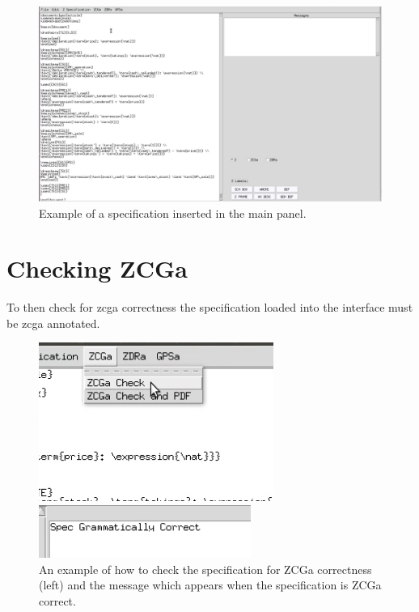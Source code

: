 \begin{figure}[H]
\includegraphics[scale=0.4]{Figures/Interface/specinserted.png}
\caption{Example of a specification inserted in the main panel. \label{fig:specinserted}}
\end{figure}

\section{Checking ZCGa}
To then check for \gls{zcga} correctness the specification loaded into the interface must be \gls{zcga} annotated.

\begin{figure}[H]
\centering
\begin{minipage}{0.45\textwidth}
\centering
\includegraphics[scale=0.5]{Figures/Interface/zcgacheck.png}
\end{minipage}\hfill
\begin{minipage}{0.45\textwidth}
\centering
\includegraphics[scale=0.6]{Figures/Interface/zcgacorrect.png}
\end{minipage}
\caption{An example of how to check the specification for ZCGa correctness (left) and the message which appears when the specification is ZCGa correct.  \label{fig:zchecheck}}
\end{figure}

